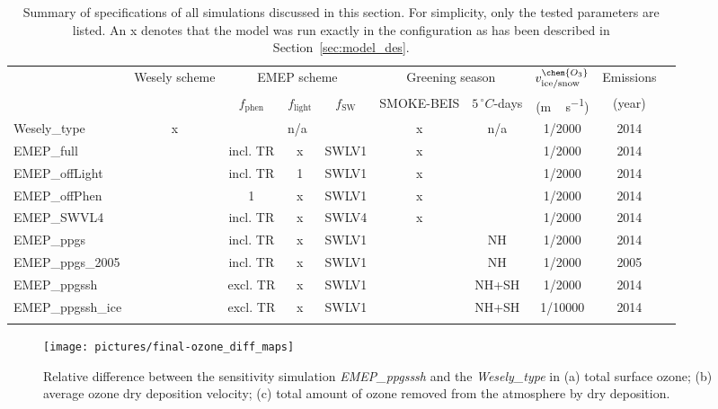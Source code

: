 \documentclass[gmd, manuscript]{copernicus}
\begin{document}
\begin{table*}[t]
  \caption{Summary of specifications of all simulations discussed in this section. For simplicity, only the tested parameters are listed. An x denotes that the model was run exactly in the configuration as has been described in Section~\ref{sec:model_des}.}
  \begin{tabular}{lccccccccc}
    \tophline
    \multirow{2}{*}{Simulation} & Wesely scheme & \multicolumn{3}{c}{EMEP scheme} & \multicolumn{2}{c}{Greening season} & $v^\chem{O_3}_\text{ice/snow}$ & Emissions\\
    & & $f_\text{phen}$ & $f_\text{light}$ & $f_\text{SW}$ & SMOKE-BEIS & $5\,\unit{^\circ C}$-days & (\unit{m\,s^{-1}}) & (year)\\
    \middlehline
    Wesely\_type      & x & \multicolumn{3}{c}{n/a}  & x & n/a   & 1/2000  & 2014 \\
    EMEP\_full        &   & incl. TR & x & SWLV1     & x &       & 1/2000  & 2014 \\
    EMEP\_offLight    &   & incl. TR & 1 & SWLV1     & x &       & 1/2000  & 2014 \\
    EMEP\_offPhen     &   & 1        & x & SWLV1     & x &       & 1/2000  & 2014 \\
    EMEP\_SWVL4       &   & incl. TR & x & SWLV4     & x &       & 1/2000  & 2014 \\
    EMEP\_ppgs        &   & incl. TR & x & SWLV1     &   & NH    & 1/2000  & 2014 \\
    EMEP\_ppgs\_2005  &   & incl. TR & x & SWLV1     &   & NH    & 1/2000  & 2005 \\
    EMEP\_ppgssh      &   & excl. TR & x & SWLV1     &   & NH+SH & 1/2000  & 2014 \\
    EMEP\_ppgssh\_ice &   & excl. TR & x & SWLV1     &   & NH+SH & 1/10000 & 2014 \\
    \bottomhline
  \end{tabular}
  \label{tab:simsum}
\end{table*}
%
\begin{figure}[t]
  \texttt{[image: pictures/final-ozone\_diff\_maps]}
  \caption{Relative difference between the sensitivity simulation \emph{EMEP\_ppgsssh} and the \emph{Wesely\_type} in (a) total surface ozone; (b) average ozone dry deposition velocity; (c) total amount of ozone removed from the atmosphere by dry deposition.}
  \label{fig:diff_maps}
\end{figure}
%
\end{document}
